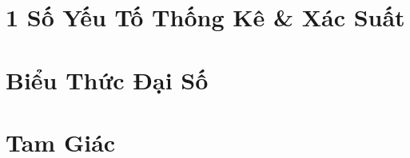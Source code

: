\documentclass{article}
\numberwithin{equation}{section}
\begin{document}
\section{1 Số Yếu Tố Thống Kê \& Xác Suất}


\section{Biểu Thức Đại Số}


\section{Tam Giác}


\printbibliography[heading=bibintoc]
	
\end{document}
